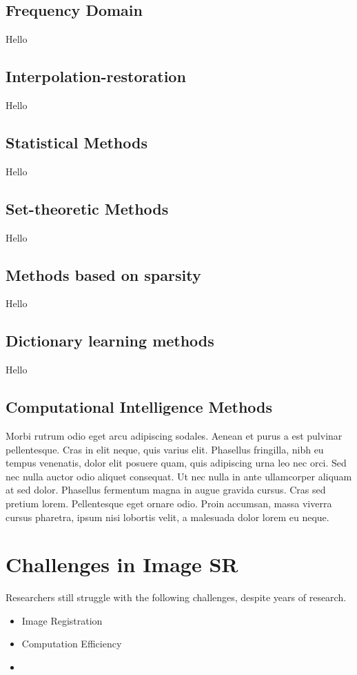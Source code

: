 \citep{Yang2010a}

\subsection{Frequency Domain}
Hello
\citep{Yang2010a}

\subsection{Interpolation-restoration}
Hello
\citep{Yang2010}

\subsection{Statistical Methods}
Hello
\citep{Yang2010a}

\subsection{Set-theoretic Methods}
Hello
\citep{Yang2010a}


\subsection{Methods based on sparsity}
Hello

\subsection{Dictionary learning methods}
Hello

\subsection{Computational Intelligence Methods}
Morbi rutrum odio eget arcu adipiscing sodales. Aenean et purus a est pulvinar pellentesque. Cras in elit neque, quis varius elit. Phasellus fringilla, nibh eu tempus venenatis, dolor elit posuere quam, quis adipiscing urna leo nec orci. Sed nec nulla auctor odio aliquet consequat. Ut nec nulla in ante ullamcorper aliquam at sed dolor. Phasellus fermentum magna in augue gravida cursus. Cras sed pretium lorem. Pellentesque eget ornare odio. Proin accumsan, massa viverra cursus pharetra, ipsum nisi lobortis velit, a malesuada dolor lorem eu neque.

\section{Challenges in Image SR}
Researchers still struggle with the following challenges, despite years of research.
\begin{itemize}
	\item Image Registration
	\item Computation Efficiency
	\item 
\end{itemize}


